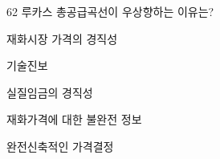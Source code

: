 \begin{question}{62}
루카스 총공급곡선이 우상향하는 이유는?
\begin{choices}
  \item 재화시장 가격의 경직성
  \item 기술진보
  \item 실질임금의 경직성
  \item 재화가격에 대한 불완전 정보
  \item 완전신축적인 가격결정
\end{choices}
\end{question}
